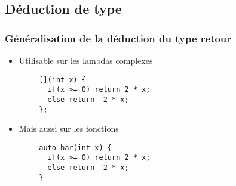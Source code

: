 \documentclass[C++.tex]{subfiles}
\begin{document}
\subsection*{Déduction de type}
\begin{frame}[fragile]
	\frametitle{Généralisation de la déduction du type retour}
	\begin{itemize}
		\item Utilisable sur les lambdas complexes
	\end{itemize}

	\begin{verbatim}
		[](int x) { 
		  if(x >= 0) return 2 * x; 
		  else return -2 * x;
		};
	\end{verbatim}

	\begin{itemize}
		\item Mais aussi sur les fonctions
	\end{itemize}

	\begin{verbatim}
		auto bar(int x) {
		  if(x >= 0) return 2 * x; 
		  else return -2 * x;
		}
	\end{verbatim}

\end{frame}
\end{document}
